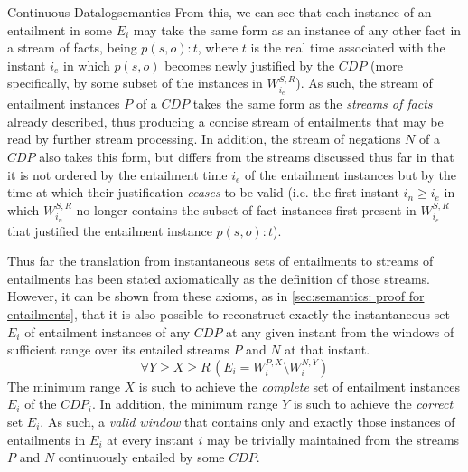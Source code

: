 \begin{nestedsection}{Continuous Datalog}{semantics}
	From this, we can see that each instance of an entailment in some $E_{i}$ may take the same form as an instance of any other fact in a stream of facts, being ${p(s,o):t}$, where $t$ is the real time associated with the instant $i_{e}$ in which ${p(s,o)}$ becomes newly justified by the ${CDP}$
	(more specifically, by some subset of the instances in $W^{S,R}_{i_{e}}$).
	As such, the stream of entailment instances $P$ of a ${CDP}$ takes the same form as the \emph{streams of facts} already described, thus producing a concise stream of entailments that may be read by further stream processing.
	In addition, the stream of negations $N$ of a ${CDP}$ also takes this form, but differs from the streams discussed thus far in that it is not ordered by the entailment time $i_{e}$ of the entailment instances but by the time at which their justification \emph{ceases} to be valid
	(i.e. the first instant ${i_{n} \geq i_{e}}$ in which $W^{S,R}_{i_{n}}$ no longer contains the subset of fact instances first present in $W^{S,R}_{i_{e}}$ that justified the entailment instance ${p(s,o):t}$).

	Thus far the translation from instantaneous sets of entailments to streams of entailments has been stated axiomatically as the definition of those streams.
	However, it can be shown from these axioms,
	as in \ref{sec:semantics: proof for entailments},
	that it is also possible to reconstruct exactly the instantaneous set $E_{i}$ of entailment instances of any ${CDP}$ at any given instant from the windows of sufficient range over its entailed streams $P$ and $N$ at that instant.
	\[ \forall Y \geq X \geq R \, \left( E_{i} = W^{P,X}_{i} \setminus W^{N,Y}_{i} \right) \]
	The minimum range $X$ is such to achieve the \emph{complete} set of entailment instances $E_{i}$ of the ${CDP}_{i}$.
	In addition, the minimum range $Y$ is such to achieve the \emph{correct} set $E_{i}$.
	As such, a \emph{valid window} that contains only and exactly those instances of entailments in $E_{i}$ at every instant $i$ may be trivially maintained from the streams $P$ and $N$ continuously entailed by some ${CDP}$.
\end{nestedsection}